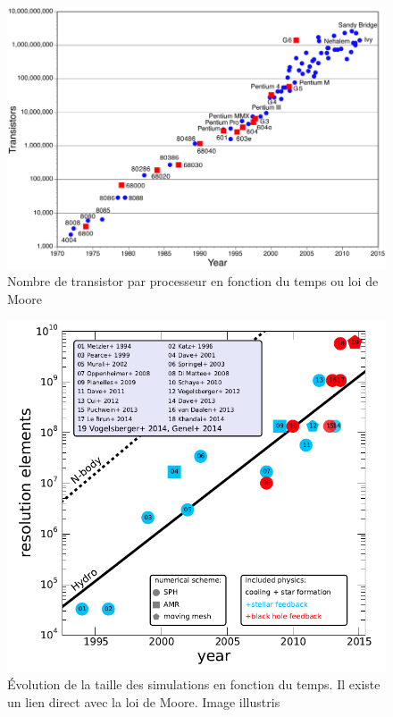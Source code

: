 \begin{figure}
        \includegraphics[width=.95\linewidth]{img/02/moorelaw.png} 
        \caption[Loi de Moore]{Nombre de transistor par processeur en fonction du temps ou loi de Moore}
 		\label{fig:moore}
\end{figure}

\begin{figure}
        \includegraphics[width=.95\linewidth]{img/02/figure_simulations_with_time.png} 
        \caption[Évolution de la taille des simulations]{Évolution de la taille des simulations en fonction du temps.
        Il existe un lien direct avec la loi de Moore.
        Image illustris}
 		\label{fig:taillesimu}
\end{figure}


